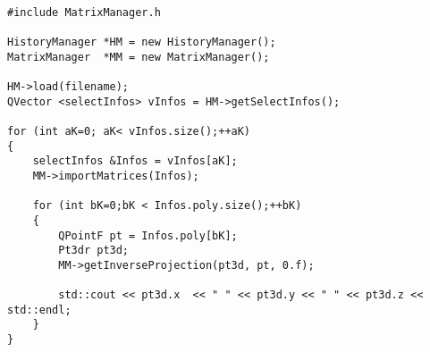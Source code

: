 \begin{verbatim}

#include MatrixManager.h

HistoryManager *HM = new HistoryManager();
MatrixManager  *MM = new MatrixManager();

HM->load(filename);
QVector <selectInfos> vInfos = HM->getSelectInfos();

for (int aK=0; aK< vInfos.size();++aK)
{
    selectInfos &Infos = vInfos[aK];
    MM->importMatrices(Infos);

    for (int bK=0;bK < Infos.poly.size();++bK)
    {
        QPointF pt = Infos.poly[bK];
        Pt3dr pt3d;
        MM->getInverseProjection(pt3d, pt, 0.f);

        std::cout << pt3d.x  << " " << pt3d.y << " " << pt3d.z << std::endl;
    }
}

\end{verbatim}



